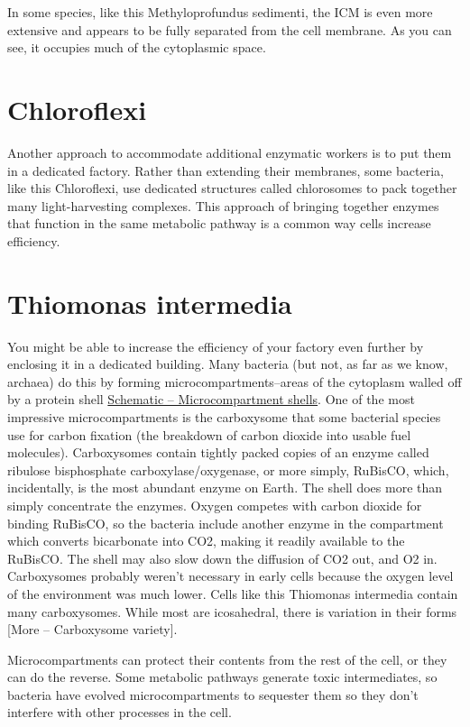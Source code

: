 \documentclass[]{tufte-book}
\begin{document}
In some species, like this Methyloprofundus sedimenti, the ICM is even
more extensive and appears to be fully separated from the cell membrane.
As you can see, it occupies much of the cytoplasmic space.

\section{Chloroflexi}\label{chloroflexi}

Another approach to accommodate additional enzymatic workers is to put
them in a dedicated factory. Rather than extending their membranes, some
bacteria, like this Chloroflexi, use dedicated structures called
chlorosomes to pack together many light-harvesting complexes. This
approach of bringing together enzymes that function in the same
metabolic pathway is a common way cells increase efficiency.

\section{Thiomonas intermedia}\label{thiomonas-intermedia}

You might be able to increase the efficiency of your factory even
further by enclosing it in a dedicated building. Many bacteria (but not,
as far as we know, archaea) do this by forming microcompartments--areas
of the cytoplasm walled off by a protein shell
\protect\hyperlink{Microcompartment_shells}{Schematic --
Microcompartment shells}. One of the most impressive microcompartments
is the carboxysome that some bacterial species use for carbon fixation
(the breakdown of carbon dioxide into usable fuel molecules).
Carboxysomes contain tightly packed copies of an enzyme called ribulose
bisphosphate carboxylase/oxygenase, or more simply, RuBisCO, which,
incidentally, is the most abundant enzyme on Earth. The shell does more
than simply concentrate the enzymes. Oxygen competes with carbon dioxide
for binding RuBisCO, so the bacteria include another enzyme in the
compartment which converts bicarbonate into CO2, making it readily
available to the RuBisCO. The shell may also slow down the diffusion of
CO2 out, and O2 in. Carboxysomes probably weren't necessary in early
cells because the oxygen level of the environment was much lower. Cells
like this Thiomonas intermedia contain many carboxysomes. While most are
icosahedral, there is variation in their forms {[}More -- Carboxysome
variety{]}.

Microcompartments can protect their contents from the rest of the cell,
or they can do the reverse. Some metabolic pathways generate toxic
intermediates, so bacteria have evolved microcompartments to sequester
them so they don't interfere with other processes in the cell.
\end{document}
